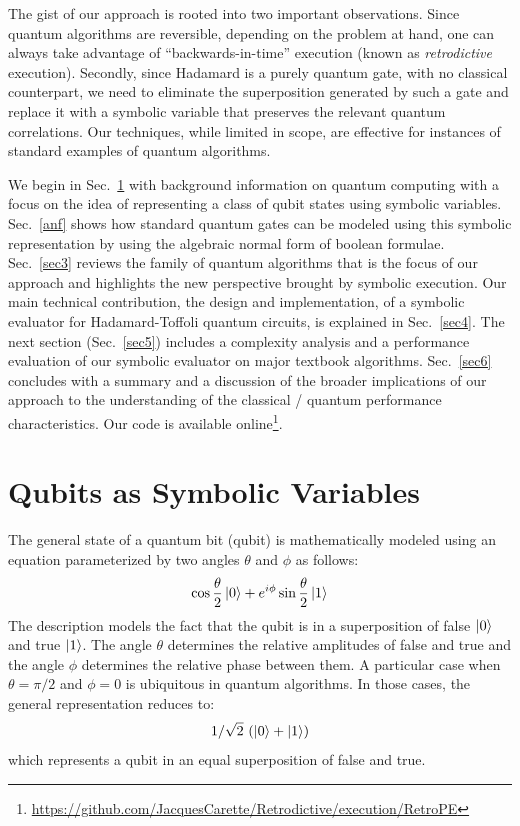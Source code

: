 \documentclass[sigplan,screen]{acmart}
\theoremstyle{definition}
\begin{document}
The gist of our approach is rooted into two important observations.
Since quantum algorithms are reversible, depending on the problem at
hand, one can always take advantage of ``backwards-in-time'' execution
(known as \emph{retrodictive} execution). Secondly, since Hadamard is
a purely quantum gate, with no classical counterpart, we need to
eliminate the superposition generated by such a gate and replace it
with a symbolic variable that preserves the relevant quantum
correlations. Our techniques, while limited in scope, are effective
for instances of standard examples of quantum algorithms.

We begin in Sec.~\ref{sec2} with background information on quantum
computing with a focus on the idea of representing a class of qubit
states using symbolic variables. Sec.~\ref{anf} shows how standard quantum
gates can be modeled using this symbolic representation by using the
algebraic normal form of boolean formulae. Sec.~\ref{sec3} reviews the
family of quantum algorithms that is the focus of our approach and
highlights the new perspective brought by symbolic execution. Our
main technical contribution, the design and implementation, of a
symbolic evaluator for Hadamard-Toffoli quantum circuits, is explained
in Sec.~\ref{sec4}. The next section (Sec.~\ref{sec5}) includes a
complexity analysis and a performance evaluation of our symbolic
evaluator on major textbook algorithms. Sec.~\ref{sec6} concludes with
a summary and a discussion of the broader implications of our approach
to the understanding of the classical / quantum performance
characteristics. Our code is available online\footnote{
\url{https://github.com/JacquesCarette/Retrodictive/execution/RetroPE}}.


\section{Qubits as Symbolic Variables}
\label{sec2}

The general state of a quantum bit (qubit) is mathematically modeled
using an equation parameterized by two angles $\theta$ and $\phi$ as
follows:
\[
\cos{\frac{\theta}{2}} \ket{0} + e^{i\phi} \sin{\frac{\theta}{2}} \ket{1}
\]
The description models the fact that the qubit is in a superposition
of false $\ket{0}$ and true $\ket{1}$. The angle $\theta$
determines the relative amplitudes of false and true and the angle
$\phi$ determines the relative phase between them. A particular case
when $\theta = \pi/2$ and $\phi=0$ is ubiquitous in quantum
algorithms. In those cases, the general representation reduces to:
\[
1/\sqrt{2}~ (\ket{0} + \ket{1} )
\]
which represents a qubit in an equal superposition of false and
true.
\end{document}
